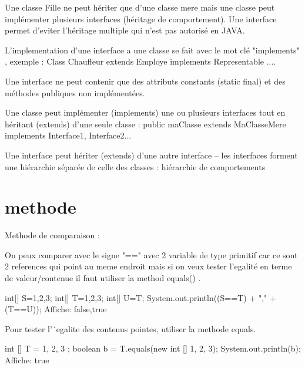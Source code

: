 \documentclass[a4paper,12pt,openany]{book}
\begin{document}
Une classe Fille ne peut hériter que d’une classe mere mais une classe peut implémenter plusieurs interfaces (héritage de comportement).
Une interface permet d'eviter l'héritage multiple qui n'est pas autorisé en JAVA.

L'implementation d'une interface a une classe se fait avec le mot clé "implements" , exemple : 
Class Chauffeur extends Employe implements Representable {....}

Une interface ne peut contenir que des attributs constants (static final) et des méthodes publiques non implémentées.

Une classe peut implémenter (implements) une ou plusieurs interfaces tout en héritant (extends) d'une seule classe :
public maClasse extends MaClasseMere implements Interface1, Interface2{...}

Une interface peut hériter (extends) d'une autre interface
– les interfaces forment une hiérarchie séparée de celle des classes : hiérarchie de comportements

\section{methode}

Methode de comparaison :

On peux comparer avec le signe "==" avec 2 variable de type primitif car ce sont 2 references qui point au meme endroit mais si on veux tester l'egalité en terme de valeur/contenue il faut utiliser la method equals() .

int[] S={1,2,3};
int[] T={1,2,3};
int[] U=T;
System.out.println((S==T) + "," + (T==U));
Affiche: false,true

Pour tester l’´egalite des contenus pointes, utiliser la methode equals.

int [] T = {1, 2, 3} ;
boolean b = T.equals(new int [] {1, 2, 3});
System.out.println(b);
Affiche: true
\end{document}
